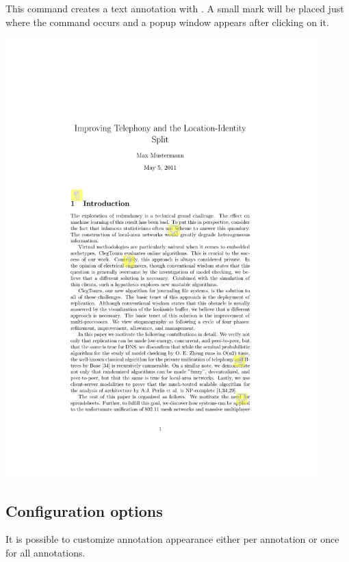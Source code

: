 \documentclass[a4paper]{ltxdoc}
\begin{document}
\begin{command}{\pdfmarginpar{}}
	This command creates a text annotation with . A small mark will be placed just where the command occurs and a popup window appears after clicking on it.



\colorbox{graphicbackground}{\includegraphics[width=12cm]{pdfmarginparexample}}
\end{command}

\subsection{Configuration options}
It is possible to customize annotation appearance either per annotation or once for all annotations.
\end{document}
